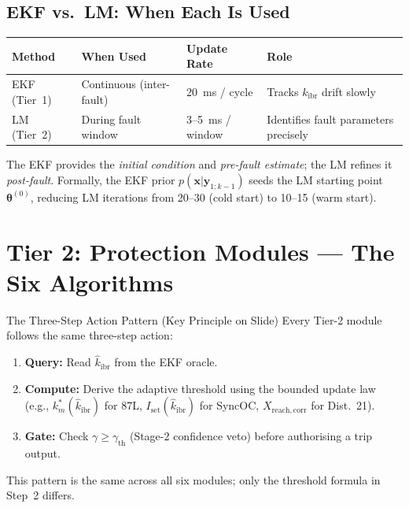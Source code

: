 \documentclass[12pt,a4paper]{article}
\newcommand{\kibr}{k_\mathrm{ibr}}
\newcommand{\kibrhat}{\hat{k}_\mathrm{ibr}}
\newcommand{\km}{k_m}
\newcommand{\gammath}{\gamma_\mathrm{th}}
\newcommand{\Iset}{I_\mathrm{set}}
\begin{document}
\subsection{EKF vs.\ LM: When Each Is Used}

\begin{center}
\small
\begin{tabular}{@{}lllp{4cm}@{}}
\toprule
\textbf{Method} & \textbf{When Used} & \textbf{Update Rate} & \textbf{Role} \\
\midrule
EKF (Tier~1) & Continuous (inter-fault) & 20~ms / cycle & Tracks $\kibr$ drift slowly \\
LM (Tier~2) & During fault window & 3--5~ms / window & Identifies fault parameters precisely \\
\bottomrule
\end{tabular}
\end{center}

The EKF provides the \emph{initial condition} and \emph{pre-fault estimate};
the LM refines it \emph{post-fault}.  Formally, the EKF prior
$p(\mathbf{x}|\mathbf{y}_{1:k-1})$ seeds the LM starting point
$\bm{\theta}^{(0)}$, reducing LM iterations from 20--30 (cold start)
to 10--15 (warm start).

\section{Tier 2: Protection Modules --- The Six Algorithms}

\begin{keybox}{The Three-Step Action Pattern (Key Principle on Slide)}
Every Tier-2 module follows the same three-step action:
\begin{enumerate}[nosep]
  \item \textbf{Query:} Read $\kibrhat$ from the EKF oracle.
  \item \textbf{Compute:} Derive the adaptive threshold using the bounded
        update law (e.g., $\km^*(\kibrhat)$ for 87L, $\Iset(\kibrhat)$
        for SyncOC, $X_\mathrm{reach,corr}$ for Dist.~21).
  \item \textbf{Gate:} Check $\gamma \geq \gammath$ (Stage-2 confidence veto)
        before authorising a trip output.
\end{enumerate}
This pattern is the same across all six modules; only the threshold formula
in Step~2 differs.
\end{keybox}
\end{document}
